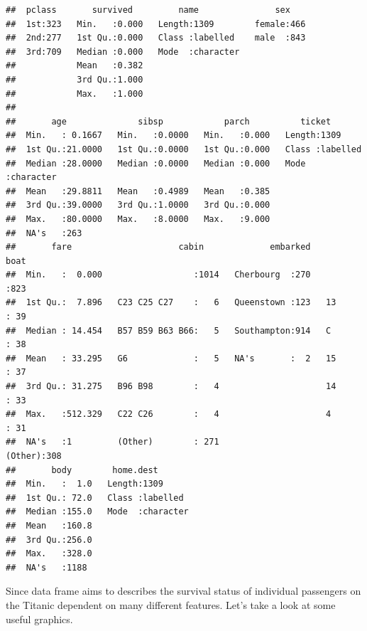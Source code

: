 \documentclass[12,]{article}
\begin{document}
\begin{verbatim}
##  pclass       survived         name               sex     
##  1st:323   Min.   :0.000   Length:1309        female:466  
##  2nd:277   1st Qu.:0.000   Class :labelled    male  :843  
##  3rd:709   Median :0.000   Mode  :character               
##            Mean   :0.382                                  
##            3rd Qu.:1.000                                  
##            Max.   :1.000                                  
##                                                           
##       age              sibsp            parch          ticket         
##  Min.   : 0.1667   Min.   :0.0000   Min.   :0.000   Length:1309       
##  1st Qu.:21.0000   1st Qu.:0.0000   1st Qu.:0.000   Class :labelled   
##  Median :28.0000   Median :0.0000   Median :0.000   Mode  :character  
##  Mean   :29.8811   Mean   :0.4989   Mean   :0.385                     
##  3rd Qu.:39.0000   3rd Qu.:1.0000   3rd Qu.:0.000                     
##  Max.   :80.0000   Max.   :8.0000   Max.   :9.000                     
##  NA's   :263                                                          
##       fare                     cabin             embarked        boat    
##  Min.   :  0.000                  :1014   Cherbourg  :270          :823  
##  1st Qu.:  7.896   C23 C25 C27    :   6   Queenstown :123   13     : 39  
##  Median : 14.454   B57 B59 B63 B66:   5   Southampton:914   C      : 38  
##  Mean   : 33.295   G6             :   5   NA's       :  2   15     : 37  
##  3rd Qu.: 31.275   B96 B98        :   4                     14     : 33  
##  Max.   :512.329   C22 C26        :   4                     4      : 31  
##  NA's   :1         (Other)        : 271                     (Other):308  
##       body        home.dest        
##  Min.   :  1.0   Length:1309       
##  1st Qu.: 72.0   Class :labelled   
##  Median :155.0   Mode  :character  
##  Mean   :160.8                     
##  3rd Qu.:256.0                     
##  Max.   :328.0                     
##  NA's   :1188
\end{verbatim}

Since data frame aims to describes the survival status of individual
passengers on the Titanic dependent on many different features. Let's
take a look at some useful graphics.
\end{document}
